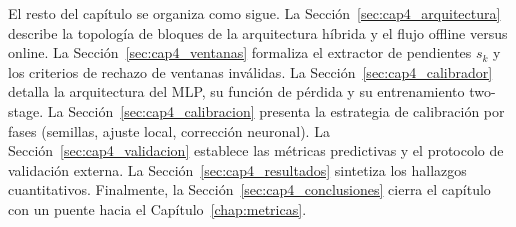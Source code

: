 El resto del capítulo se organiza como sigue. La Sección~\ref{sec:cap4_arquitectura} describe la topología de bloques de la arquitectura híbrida y el flujo offline versus online. La Sección~\ref{sec:cap4_ventanas} formaliza el extractor de pendientes $s_k$ y los criterios de rechazo de ventanas inválidas. La Sección~\ref{sec:cap4_calibrador} detalla la arquitectura del MLP, su función de pérdida y su entrenamiento two-stage. La Sección~\ref{sec:cap4_calibracion} presenta la estrategia de calibración por fases (semillas, ajuste local, corrección neuronal). La Sección~\ref{sec:cap4_validacion} establece las métricas predictivas y el protocolo de validación externa. La Sección~\ref{sec:cap4_resultados} sintetiza los hallazgos cuantitativos. Finalmente, la Sección~\ref{sec:cap4_conclusiones} cierra el capítulo con un puente hacia el Capítulo~\ref{chap:metricas}.
